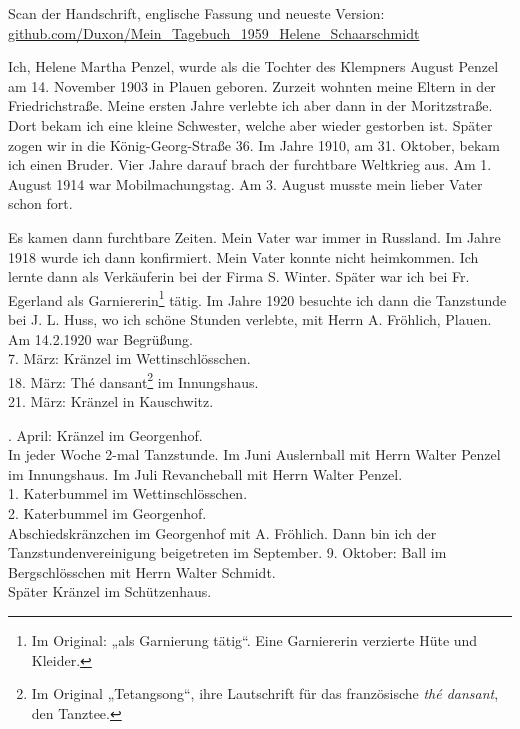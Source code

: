 \documentclass[a5paper,11pt,openany]{book}
\newcommand{\seite}[1]{\leavevmode\marginpar{\footnotesize\itshape\raggedright #1}\ignorespaces}
\begin{document}
\vfill
{\small\noindent Scan der Handschrift, englische Fassung und neueste Version:\\
\href{https://github.com/Duxon/Mein_Tagebuch_1959_Helene_Schaarschmidt}{github.com/Duxon/\allowbreak Mein\_Tagebuch\_1959\_Helene\_Schaarschmidt}\par}

\mainmatter
\seite{1}
Ich, Helene Martha Penzel, wurde als die Tochter des Klempners August Penzel am 14. November 1903 in Plauen geboren.
Zurzeit wohnten meine Eltern in der Friedrichstraße.
Meine ersten Jahre verlebte ich aber dann in der Moritzstraße.
Dort bekam ich eine kleine Schwester, welche aber wieder gestorben ist.
Später zogen wir in die König-Georg-Straße 36.
Im Jahre 1910, am 31. Oktober, bekam ich einen Bruder.
Vier Jahre darauf brach der furchtbare Weltkrieg aus.
Am 1. August 1914 war Mobilmachungstag.
Am 3. August musste mein lieber Vater schon fort.

\seite{2}
Es kamen dann furchtbare Zeiten.
Mein Vater war immer in Russland.
Im Jahre 1918 wurde ich dann konfirmiert.
Mein Vater konnte nicht heimkommen.
Ich lernte dann als Verkäuferin bei der Firma S. Winter.
Später war ich bei Fr. Egerland als Garniererin\footnote{Im Original: „als Garnierung tätig“. Eine Garniererin verzierte Hüte und Kleider.} tätig.
Im Jahre 1920 besuchte ich dann die Tanzstunde bei J. L. Huss, wo ich schöne Stunden verlebte, mit Herrn A. Fröhlich, Plauen.
Am 14.2.1920 war Begrüßung.\\
7. März: Kränzel im Wettinschlösschen.\\
18. März: Thé dansant\footnote{Im Original „Tetangsong“, ihre Lautschrift für das französische \emph{thé dansant}, den Tanztee.} im Innungshaus.\\
21. März: Kränzel in Kauschwitz.

\seite{3}
18. April: Kränzel im Georgenhof.\\
In jeder Woche 2-mal Tanzstunde.
Im Juni Auslernball mit Herrn Walter Penzel im Innungshaus.
Im Juli Revancheball mit Herrn Walter Penzel.\\
1. Katerbummel im Wettinschlösschen.\\
2. Katerbummel im Georgenhof.\\
Abschiedskränzchen im Georgenhof mit A. Fröhlich.
Dann bin ich der Tanzstundenvereinigung beigetreten im September.
9. Oktober: Ball im Bergschlösschen mit Herrn Walter Schmidt.\\
Später Kränzel im Schützenhaus.
\end{document}
